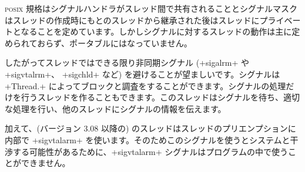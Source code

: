 \textsc{posix} 規格はシグナルハンドラがスレッド間で共有されることとシグナルマスクはスレッドの作成時にもとのスレッドから継承された後はスレッドにプライベートとなることを定めています。しかしシグナルに対するスレッドの動作は主に定められておらず、ポータブルにはなっていません。

したがってスレッドではできる限り非同期シグナル (\ml+sigalrm+ や \ml+sigvtalrm+、 \ml+sigchld+ など) を避けることが望ましいです。シグナルは \ml+Thread.+ によってブロックと調査をすることができます。シグナルの処理だけを行うスレッドを作ることもできます。このスレッドはシグナルを待ち、適切な処理を行い、他のスレッドにシグナルの情報を伝えます。

加えて、(バージョン 3.08 以降の) \ocaml のスレッドはスレッドのプリエンプションに内部で \ml+sigvtalarm+ を使います。そのためこのシグナルを使うとシステムと干渉する可能性があるために、\ml+sigvtalarm+ シグナルはプログラムの中で使うことができません。

